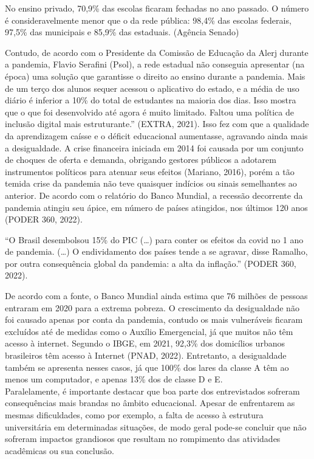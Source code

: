\documentclass[
]{article}
\begin{document}
No ensino privado, 70,9\% das escolas ficaram fechadas no ano passado. O
número é consideravelmente menor que o da rede pública: 98,4\% das
escolas federais, 97,5\% das municipais e 85,9\% das estaduais. (Agência
Senado)

Contudo, de acordo com o Presidente da Comissão de Educação da Alerj
durante a pandemia, Flavio Serafini (Psol), a rede estadual não
conseguia apresentar (na época) uma solução que garantisse o direito ao
ensino durante a pandemia. Mais de um terço dos alunos sequer acessou o
aplicativo do estado, e a média de uso diário é inferior a 10\% do total
de estudantes na maioria dos dias. Isso mostra que o que foi
desenvolvido até agora é muito limitado. Faltou uma política de inclusão
digital mais estruturante.'' (EXTRA, 2021). Isso fez com que a qualidade
da aprendizagem caísse e o déficit educacional aumentasse, agravando
ainda mais a desigualdade. A crise financeira iniciada em 2014 foi
causada por um conjunto de choques de oferta e demanda, obrigando
gestores públicos a adotarem instrumentos políticos para atenuar seus
efeitos (Mariano, 2016), porém a tão temida crise da pandemia não teve
quaisquer indícios ou sinais semelhantes ao anterior. De acordo com o
relatório do Banco Mundial, a recessão decorrente da pandemia atingiu
seu ápice, em número de países atingidos, nos últimos 120 anos (PODER
360, 2022).

``O Brasil desembolsou 15\% do PIC (\ldots) para conter os efeitos da
covid no 1 ano de pandemia. (\ldots) O endividamento dos países tende a
se agravar, disse Ramalho, por outra consequência global da pandemia: a
alta da inflação.'' (PODER 360, 2022).

De acordo com a fonte, o Banco Mundial ainda estima que 76 milhões de
pessoas entraram em 2020 para a extrema pobreza. O crescimento da
desigualdade não foi causado apenas por conta da pandemia, contudo os
mais vulneráveis ficaram excluídos até de medidas como o Auxílio
Emergencial, já que muitos não têm acesso à internet. Segundo o IBGE, em
2021, 92,3\% dos domicílios urbanos brasileiros têm acesso à Internet
(PNAD, 2022). Entretanto, a desigualdade também se apresenta nesses
casos, já que 100\% dos lares da classe A têm ao menos um computador, e
apenas 13\% dos de classe D e E.\\
Paralelamente, é importante destacar que boa parte dos entrevistados
sofreram consequências mais brandas no âmbito educacional. Apesar de
enfrentarem as mesmas dificuldades, como por exemplo, a falta de acesso
à estrutura universitária em determinadas situações, de modo geral
pode-se concluir que não sofreram impactos grandiosos que resultam no
rompimento das atividades acadêmicas ou sua conclusão.
\end{document}
